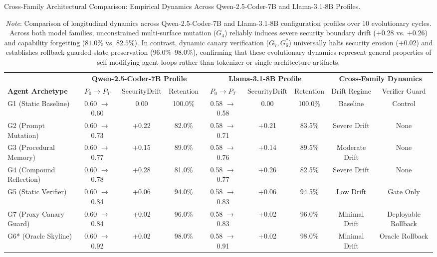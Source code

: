 \begin{table}[t]
\centering
\small
\caption{Cross-Family Architectural Comparison: Empirical Dynamics Across Qwen-2.5-Coder-7B and Llama-3.1-8B Profiles.}
\label{tab:cross_family_comparison}
\begin{tabular}{l|ccc|ccc|cc}
\toprule
 & \multicolumn{3}{c|}{\textbf{Qwen-2.5-Coder-7B Profile}} & \multicolumn{3}{c|}{\textbf{Llama-3.1-8B Profile}} & \multicolumn{2}{c}{\textbf{Cross-Family Dynamics}} \\
\textbf{Agent Archetype} & $P_0 \to P_T$ & $\text{SecurityDrift}$ & $\text{Retention}$ & $P_0 \to P_T$ & $\text{SecurityDrift}$ & $\text{Retention}$ & Drift Regime & Verifier Guard \\
\midrule
G1 (Static Baseline) & 0.60 $\to$ 0.60 & 0.00 & 100.0\% & 0.58 $\to$ 0.58 & 0.00 & 100.0\% & Baseline & Control \\
G2 (Prompt Mutation) & 0.60 $\to$ 0.73 & +0.22 & 82.0\% & 0.58 $\to$ 0.71 & +0.21 & 83.5\% & Severe Drift & None \\
G3 (Procedural Memory) & 0.60 $\to$ 0.77 & +0.15 & 89.0\% & 0.58 $\to$ 0.76 & +0.14 & 89.5\% & Moderate Drift & None \\
G4 (Compound Reflection) & 0.60 $\to$ 0.78 & +0.28 & 81.0\% & 0.58 $\to$ 0.77 & +0.26 & 82.5\% & Severe Drift & None \\
G5 (Static Verifier) & 0.60 $\to$ 0.84 & +0.06 & 94.0\% & 0.58 $\to$ 0.83 & +0.06 & 94.5\% & Low Drift & Gate Only \\
G7 (Proxy Canary Guard) & 0.60 $\to$ 0.84 & +0.02 & 96.0\% & 0.58 $\to$ 0.83 & +0.02 & 96.0\% & Minimal Drift & Deployable Rollback \\
G6* (Oracle Skyline) & 0.60 $\to$ 0.92 & +0.02 & 98.0\% & 0.58 $\to$ 0.91 & +0.02 & 98.0\% & Minimal Drift & Oracle Rollback \\
\bottomrule
\end{tabular}
\vspace{1mm}
\caption*{\footnotesize \textit{Note}: Comparison of longitudinal dynamics across Qwen-2.5-Coder-7B and Llama-3.1-8B configuration profiles over 10 evolutionary cycles. Across both model families, unconstrained multi-surface mutation ($G_4$) reliably induces severe security boundary drift ($+0.28$ vs. $+0.26$) and capability forgetting ($81.0\%$ vs. $82.5\%$). In contrast, dynamic canary verification ($G_7, G_6^*$) universally halts security erosion ($+0.02$) and establishes rollback-guarded state preservation ($96.0\%\text{--}98.0\%$), confirming that these evolutionary dynamics represent general properties of self-modifying agent loops rather than tokenizer or single-architecture artifacts.}
\end{table}